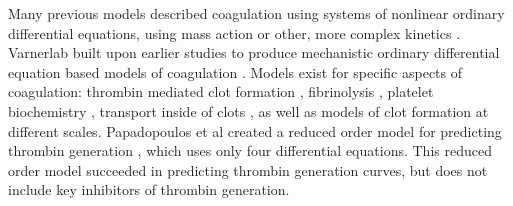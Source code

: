 \documentclass[11pt]{article}
\begin{document}

Many previous models described coagulation using systems of nonlinear ordinary differential equations, using mass action or other, more complex kinetics \citep{Khanin:1989aa,Willems:1991aa,Baldwin:1994aa,Leipold:1995aa,Kuharsky:2001aa}. Varnerlab built upon earlier studies \citep{Jones:1994aa,Hockin:2002aa,Butenas:2004aa} to produce mechanistic ordinary differential equation based models of coagulation \citep{Luan:2007aa,Luan:2010aa}. Models exist for specific aspects of coagulation: thrombin mediated clot formation \citep{Chatterjee:2010aa}, fibrinolysis \citep{Mitrophanov:2014aa}, platelet biochemistry \citep{Stalker:2013aa}, transport inside of clots \citep{Voronov:2013aa}, as well as models of clot formation at different scales\citep{Leiderman:2014aa, Bannish:2014ab}. Papadopoulos et al created a reduced order model for predicting thrombin generation \citep{Atkin:2014}, which uses only four differential equations. This reduced order model succeeded in predicting thrombin generation curves, but does not include key inhibitors of thrombin generation.  
\end{document}

